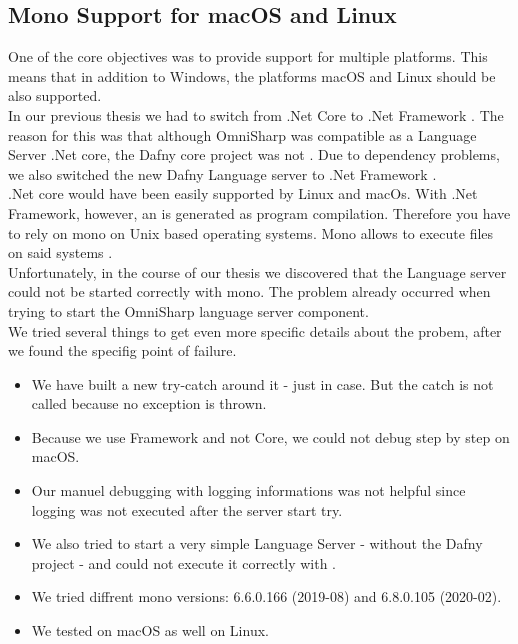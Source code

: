 \subsection{Mono Support for macOS and Linux}
\label{section:implementation:mono}
One of the core objectives was to provide support for multiple platforms.
This means that in addition to Windows, the platforms macOS and Linux should be also supported. \\

In our previous thesis we had to switch from .Net Core to .Net Framework \cite{sa}.
The reason for this was that although OmniSharp was compatible as a Language Server .Net core,
the Dafny core project was not \cite{sa}.
Due to dependency problems, we also switched the new Dafny Language server to .Net Framework \cite{sa}. \\

.Net core would have been easily supported by Linux and macOs.
With .Net Framework, however, an  is generated as program compilation.
Therefore you have to rely on mono on Unix based operating systems.
Mono allows to execute  files on said systems \cite{mono}. \\

Unfortunately, in the course of our thesis we discovered that the Language server could not be started correctly with mono.
The problem already occurred when trying to start the OmniSharp language server component. \\

We tried several things to get even more specific details about the probem, after we found the specifig point of failure.

\begin{itemize}
    \item We have built a new try-catch around it - just in case. But the catch is not called because no exception is thrown.
    \item Because we use Framework and not Core, we could not debug step by step on macOS.
    \item Our manuel debugging with logging informations was not helpful since logging was not executed after the server start try.
    \item We also tried to start a very simple Language Server - without the Dafny project - and could not execute it correctly with .
    \item We tried diffrent mono versions: 6.6.0.166 (2019-08) and 6.8.0.105 (2020-02).
    \item We tested on macOS as well on Linux.
\end{itemize}

